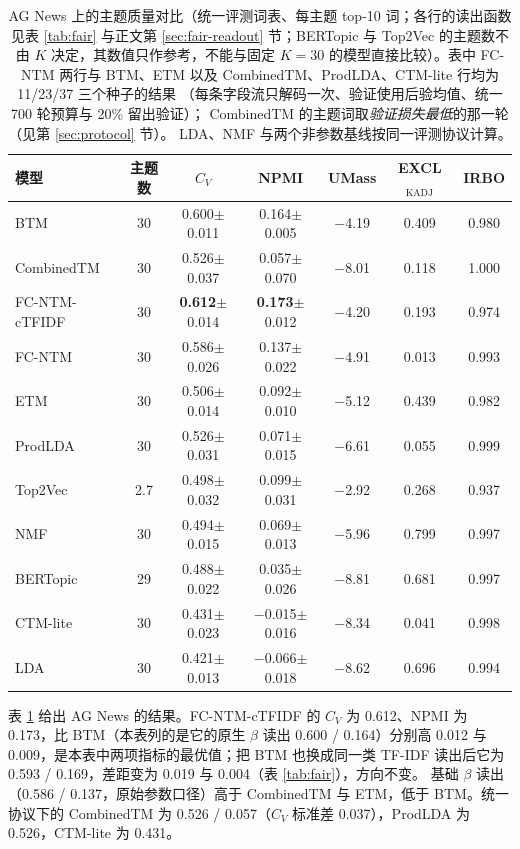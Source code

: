 \documentclass[11pt]{ctexart}
\newcommand{\fcntm}{FC-NTM}
\begin{document}
\begin{table}[t]
\centering
\caption{AG News 上的主题质量对比（统一评测词表、每主题 top-10 词；各行的读出函数见表
\ref{tab:fair} 与正文第 \ref{sec:fair-readout} 节；BERTopic 与 Top2Vec 的主题数不由 $K$
决定，其数值只作参考，不能与固定 $K=30$ 的模型直接比较）。表中 \fcntm{} 两行与
BTM、ETM 以及 CombinedTM、ProdLDA、CTM-lite 行均为 11/23/37 三个种子的结果
（每条字段流只解码一次、验证使用后验均值、统一 700 轮预算与 20\% 留出验证）；
CombinedTM 的主题词取\emph{验证损失最低}的那一轮（见第 \ref{sec:protocol} 节）。
LDA、NMF 与两个非参数基线按同一评测协议计算。}
\label{tab:agnews}
\small
\begin{tabular}{lcccccc}
\toprule
模型 & 主题数 & $C_V$ & NPMI & UMass & EXCL$_{\mathrm{KADJ}}$ & IRBO \\
\midrule
BTM & 30 & 0.600$\pm$0.011 & 0.164$\pm$0.005 & $-$4.19 & 0.409 & 0.980 \\
CombinedTM & 30 & 0.526$\pm$0.037 & 0.057$\pm$0.070 & $-$8.01 & 0.118 & 1.000 \\
\fcntm{}-cTFIDF & 30 & \textbf{0.612}$\pm$0.014 & \textbf{0.173}$\pm$0.012 & $-$4.20 & 0.193 & 0.974 \\
\fcntm{} & 30 & 0.586$\pm$0.026 & 0.137$\pm$0.022 & $-$4.91 & 0.013 & 0.993 \\
ETM & 30 & 0.506$\pm$0.014 & 0.092$\pm$0.010 & $-$5.12 & 0.439 & 0.982 \\
ProdLDA & 30 & 0.526$\pm$0.031 & 0.071$\pm$0.015 & $-$6.61 & 0.055 & 0.999 \\
Top2Vec & 2.7 & 0.498$\pm$0.032 & 0.099$\pm$0.031 & $-$2.92 & 0.268 & 0.937 \\
NMF & 30 & 0.494$\pm$0.015 & 0.069$\pm$0.013 & $-$5.96 & 0.799 & 0.997 \\
BERTopic & 29 & 0.488$\pm$0.022 & 0.035$\pm$0.026 & $-$8.81 & 0.681 & 0.997 \\
CTM-lite & 30 & 0.431$\pm$0.023 & $-$0.015$\pm$0.016 & $-$8.34 & 0.041 & 0.998 \\
LDA & 30 & 0.421$\pm$0.013 & $-$0.066$\pm$0.018 & $-$8.62 & 0.696 & 0.994 \\
\bottomrule
\end{tabular}
\end{table}

表 \ref{tab:agnews} 给出 AG News 的结果。\fcntm{}-cTFIDF 的
$C_V$ 为 0.612、NPMI 为 0.173，比 BTM（本表列的是它的原生 $\beta$ 读出
0.600 / 0.164）分别高 0.012 与 0.009，是本表中两项指标的最优值；把 BTM 也换成同一类
TF-IDF 读出后它为 0.593 / 0.169，差距变为 0.019 与 0.004（表 \ref{tab:fair}），方向不变。
基础 $\beta$ 读出（0.586 / 0.137，原始参数口径）高于 CombinedTM 与 ETM，低于 BTM。统一协议下的
CombinedTM 为 0.526 / 0.057（$C_V$ 标准差 0.037），ProdLDA 为 0.526，CTM-lite 为 0.431。
\end{document}

